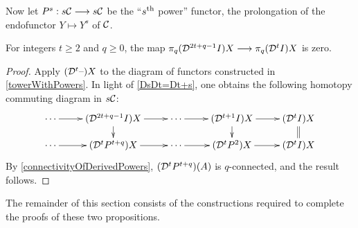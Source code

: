 \documentclass[10pt]{article}
\newcommand{\caldup}[1]{\calD^{\smash{#1}}}
\newcommand{\Comm}{\calC}
\begin{document}
\begin{convergence}
Now let $P^s:s\Comm\to s\Comm$ be the ``$s^\textup{th}$ power'' functor, the prolongation of the endofunctor $Y\mapsto Y^s$ of $\Comm$.
\begin{prop}\label{convergenceProp}
For integers $t\geq2$ and $q\geq0$, the map $\pi_q(\caldup{2t+q-1}I)X\to\pi_q(\caldup{t}I)X$ is zero.
\end{prop}
\begin{proof}%
Apply $(\caldup{t}\DASH)X$ to the diagram of functors constructed in \ref{towerWithPowers}. In light of \ref{DsDt=Dt+s}, one obtains the following homotopy commuting diagram in $s\Comm$:
\[\xymatrix@R=4mm{
\cdots 
\ar[r]
&%
(\caldup{2t+q-1}I)X
\ar[r]
\ar[d]
&
\cdots \ar[r]
&%
(\caldup{t+1}I)X
\ar[r]
\ar[d]&%
(\caldup{t}I)X
\ar@{=}[d]
\\%
\cdots
\ar[r]
&%
(\caldup{t}P^{t+q})X
\ar[r]
&%
\cdots 
\ar[r]&%
(\caldup{t}P^2)X
\ar[r]
&%
(\caldup{t}I)X%
}\]
By \ref{connectivityOfDerivedPowers}, $(\caldup{t}P^{t+q})(A)$ is $q$-connected, and the result follows.
\end{proof}
The remainder of this section consists of the constructions required to complete the proofs of these two propositions.

\end{convergence}
\end{document}
